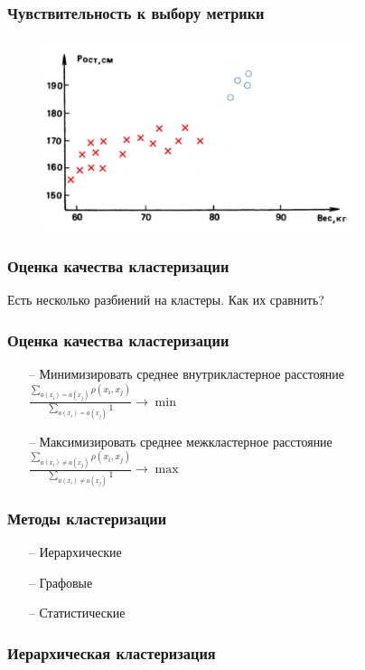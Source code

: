\documentclass[12pt]{beamer}
\begin{document}
\begin{frame}\frametitle{Чувствительность к выбору метрики}
\begin{figure}[htbp]
  \includegraphics[height=160pt, keepaspectratio = true]{images/students2}  
\end{figure}
\end{frame}

\begin{frame}\frametitle{Оценка качества кластеризации}
Есть несколько разбиений на кластеры. Как их сравнить?
\end{frame}

\begin{frame}\frametitle{Оценка качества кластеризации}
\begin{itemize}
\item[--] Минимизировать среднее внутрикластерное расстояние\\
\vspace{5mm}
${\frac{\sum\limits_{a(x_i) = a(x_j)} \rho(x_i, x_j)}{\sum\limits_{a(x_i) = a(x_j)} 1} \rightarrow \min}$
\item[--] Максимизировать среднее межкластерное расстояние\\
\vspace{5mm}
${\frac{\sum\limits_{a(x_i) \neq a(x_j)} \rho(x_i, x_j)}{\sum\limits_{a(x_i) \neq a(x_j)} 1} \rightarrow \max}$
\end{itemize}
\end{frame}

\begin{frame}\frametitle{Методы кластеризации}
\begin{itemize}
\item[--] Иерархические
\item[--] Графовые 
\item[--] Статистические 
\end{itemize}
\end{frame}

\begin{frame}\frametitle{Иерархическая кластеризация}
\end{frame}
\end{document}
